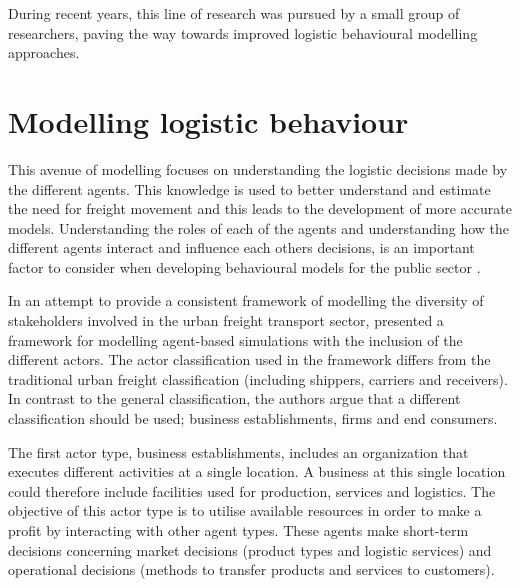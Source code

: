  During recent years, this line of research was pursued by a small group of researchers, paving the way towards improved logistic behavioural modelling approaches.


\section{Modelling logistic behaviour}
This avenue of modelling focuses on understanding the logistic decisions made by the different agents. This knowledge is used to better understand and estimate the need for freight movement and this leads to the development of more accurate models. Understanding the roles of each of the agents and understanding how the different agents interact and influence each others decisions, is an important factor to consider when developing behavioural models for the public sector \citep{roorda2010conceptual}.\par

In an attempt to provide a consistent framework of modelling the diversity of stakeholders involved in the urban freight transport sector, \citet{roorda2010conceptual} presented a framework for modelling agent-based simulations with the inclusion of the different actors. The actor classification used in the framework differs from the traditional urban freight classification (including shippers, carriers and receivers). In contrast to the general classification, the authors argue that a different classification should be used; business establishments, firms and end consumers. \par

The first actor type, business establishments, includes an organization that executes different activities at a single location. A business at this single location could therefore include facilities used for production, services and logistics. The objective of this actor type is to utilise available resources in order to make a profit by interacting with other agent types. These agents make short-term decisions concerning market decisions (product types and logistic services) and operational decisions (methods to transfer products and services to customers).\par

